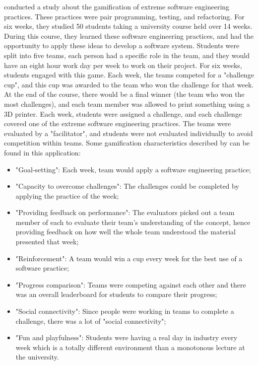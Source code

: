 \documentclass{l4proj}
\begin{document}
\citet{akpolat_enhancing_2014} conducted a study about the gamification of extreme software engineering practices. These practices were pair programming, testing, and refactoring.
For six weeks, they studied 50 students taking a university course held over 14 weeks. During this course, they learned these software engineering practices,
and had the opportunity to apply these ideas to develop a software system. Students were split into five teams, each person had a specific role in the team,
and they would have an eight hour work day per week to work on their project. For six weeks, students engaged with this game. Each week, the teams competed for a "challenge cup", 
and this cup was awarded to the team who won the challenge for that week. At the end of the course, there would be a final winner (the team who won the most challenges),
and each team member was allowed to print something using a 3D printer. Each week, students were assigned a challenge, 
and each challenge covered one of the extreme software engineering practices. The teams were evaluated by a "facilitator", 
and students were not evaluated individually to avoid competition within teams.
Some gamification characteristics described by \citet{cugelman_gamification:_2013} can be found in this application:
\begin{itemize}
    \item "Goal-setting": Each week, team would apply a software engineering practice;
    \item "Capacity to overcome challenges": The challenges could be completed by applying the practice of the week;
    \item "Providing feedback on performance": The evaluators picked out a team member of each to evaluate their team's understanding of the concept, 
    hence providing feedback on how well the whole team understood the material presented that week;
    \item "Reinforcement": A team would win a cup every week for the best use of a software practice;
    \item "Progress comparison": Teams were competing against each other and there was an overall leaderboard for students to compare their progress;
    \item "Social connectivity": Since people were working in teams to complete a challenge, there was a lot of "social connectivity";
    \item "Fun and playfulness": Students were having a real day in industry every week which is a totally different environment than a monotonous lecture at the university. 
\end{itemize}
\end{document}
